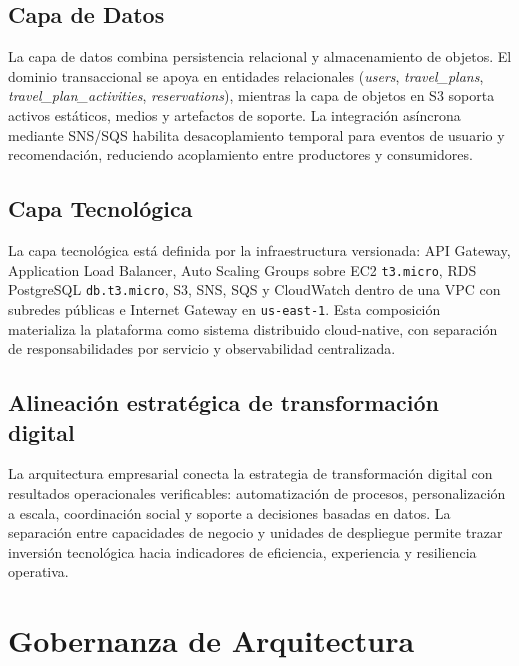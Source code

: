 \documentclass[12pt, letterpaper]{article}
\begin{document}
\subsection{Capa de Datos}

La capa de datos combina persistencia relacional y almacenamiento de objetos. El dominio transaccional se apoya en entidades relacionales (\textit{users}, \textit{travel\_plans}, \textit{travel\_plan\_activities}, \textit{reservations}), mientras la capa de objetos en S3 soporta activos estáticos, medios y artefactos de soporte. La integración asíncrona mediante SNS/SQS habilita desacoplamiento temporal para eventos de usuario y recomendación, reduciendo acoplamiento entre productores y consumidores.

\subsection{Capa Tecnológica}

La capa tecnológica está definida por la infraestructura versionada: API Gateway, Application Load Balancer, Auto Scaling Groups sobre EC2 \texttt{t3.micro}, RDS PostgreSQL \texttt{db.t3.micro}, S3, SNS, SQS y CloudWatch dentro de una VPC con subredes públicas e Internet Gateway en \texttt{us-east-1}. Esta composición materializa la plataforma como sistema distribuido cloud-native, con separación de responsabilidades por servicio y observabilidad centralizada.

\subsection{Alineación estratégica de transformación digital}

La arquitectura empresarial conecta la estrategia de transformación digital con resultados operacionales verificables: automatización de procesos, personalización a escala, coordinación social y soporte a decisiones basadas en datos. La separación entre capacidades de negocio y unidades de despliegue permite trazar inversión tecnológica hacia indicadores de eficiencia, experiencia y resiliencia operativa.

\section{Gobernanza de Arquitectura}
\end{document}
